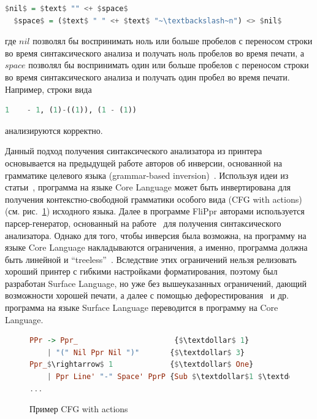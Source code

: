 \begin{lstlisting}[language=Haskell,mathescape]
  $nil$ = $text$ "" <+ $space$
  $space$ = ($text$ " " <+ $text$ "~\textbackslash~n") <> $nil$
\end{lstlisting}

\noindent где $nil$ позволял бы воспринимать ноль или больше пробелов с переносом строки во 
время синтаксического анализа и получать ноль пробелов во время печати, а  $space$ позволял 
бы воспринимать один или больше пробелов с переносом строки во время синтаксического 
анализа и получать один пробел во время печати. Например, строки вида 

\begin{lstlisting}[language=Haskell]
   1    - 1, (1)-((1)), (1 - (1))
\end{lstlisting} 

\noindent анализируются корректно.

Данный подход получения синтаксического анализатора из принтера основывается на предыдущей работе авторов
об инверсии, основанной на грамматике целевого языка
(grammar-based inversion)~\cite{MatsudaPrew}.
Используя идеи из статьи~\cite{MatsudaPrew}, 
программа на языке Core Language может быть инвертирована для получения контекстно-свободной 
грамматики особого вида (CFG with actions) (см. рис.~\ref{CFGAct}) исходного языка. 
Далее в программе FliPpr авторами используется парсер-генератор, основанный на работе~\cite{Frost} 
для получения синтаксического анализатора. Однако для того, чтобы инверсия была возможна, 
на программу на языке Core Language накладываются ограничения, а именно, программа должна 
быть линейной и ``treeless''~\cite{WadlerDeforest}. Вследствие этих ограничений нельзя 
релизовать хороший принтер с гибкими настройками форматирования, поэтому был разработан 
Surface Language, но уже без вышеуказанных ограничений, дающий возможности хорошей 
печати, а далее с помощью дефорестирования~\cite{WadlerDeforest} и др. программа на языке 
Surface Language переводится в программу на Core Language.

\begin{figure}[h]
\centering
\begin{lstlisting}[language=Haskell,mathescape]
PPr -> Ppr_                      {$\textdollar$ 1}
    | "(" Nil Ppr Nil ")"       {$\textdollar$ 3} 
Ppr_$\rightarrow$ 1             {$\textdollar$ One}
    | Ppr Line' "-" Space' PprP {Sub $\textdollar$1 $\textdollar$5 }
...    
\end{lstlisting}
\caption{Пример CFG with actions}
\label{CFGAct}
\end{figure}

